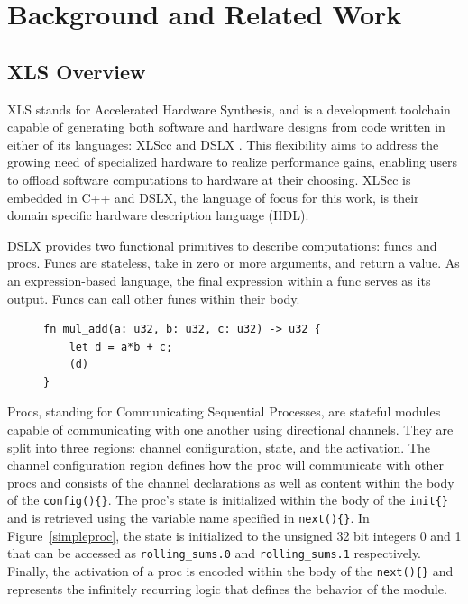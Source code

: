 \chapter{Background and Related Work}
\section[XLS Overview]{XLS Overview}
XLS stands for Accelerated Hardware Synthesis, and is a development toolchain capable of generating both software and hardware designs from code written in either of its languages: XLScc and DSLX \cite{xlsweb}. This flexibility aims to address the growing need of specialized hardware to realize performance gains, enabling users to offload software computations to hardware at their choosing. XLScc is embedded in C++ and DSLX, the language of focus for this work, is their domain specific hardware description language (HDL).

DSLX provides two functional primitives to describe computations: funcs and procs. Funcs are stateless, take in zero or more arguments, and return a value. As an expression-based language, the final expression within a func serves as its output. Funcs can call other funcs within their body.

\begin{figure}[ht]
\begin{lstlisting}[label={simplefunc}, caption=An example func, captionpos=b, style=mystyle]
fn mul_add(a: u32, b: u32, c: u32) -> u32 {
    let d = a*b + c;
    (d)
}
\end{lstlisting}
\end{figure}



Procs, standing for Communicating Sequential Processes, are stateful modules capable of communicating with one another using directional channels. They are split into three regions: channel configuration, state, and the activation. The channel configuration region defines how the proc will communicate with other procs and consists of the channel declarations as well as content within the body of the \lstinline[style=mystyle]|config(){}|. The proc's state is initialized within the body of the \lstinline[style=mystyle]|init{}| and is retrieved using the variable name specified in \lstinline[style=mystyle]|next(){}|. In Figure~\ref{simpleproc}, the state is initialized to the unsigned 32 bit integers 0 and 1 that can be accessed as \lstinline[style=mystyle]|rolling_sums.0| and \lstinline[style=mystyle]|rolling_sums.1| respectively. Finally, the activation of a proc is encoded within the body of the \lstinline[style=mystyle]|next(){}| and represents the infinitely recurring logic that defines the behavior of the module.

